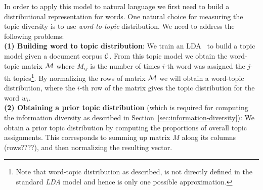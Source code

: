 \documentclass{article} %
\begin{document}
In order to apply this model to natural language we first need to build a distributional representation for words. One
natural choice for measuring the topic diversity is to use {\sl word-to-topic} distribution. We need to address the following problems:\\
{\bf (1) Building word to topic distribution}: We train an
LDA~\cite{Blei:2003:LDA:944919.944937} to build a topic model given a document corpus ${\mathcal C}$. From this topic model we obtain the
word-topic matrix ${\mathcal M}$ where $M_{ij}$ is the number of times $i$-th word was assigned the $j$-th topics\footnote{Note that word-topic distribution as described, is not directly defined in the standard {\em LDA} model and hence is only one possible approximation.}. By normalizing the rows of matrix ${\mathcal M}$ we will obtain
a word-topic distribution, where the $i$-th row of the matrix gives the topic distribution for the word $w_i$.\\
{\bf (2) Obtaining a prior topic distribution} (which is
required for computing the information diversity as described in Section~\ref{sec:information-diversity}): We obtain a prior
 topic distribution by computing the proportions of overall topic
 assignments. This corresponds to summing up matrix $M$ along its
 columns (rows????), and then normalizing the resulting vector.\\

\end{document}
